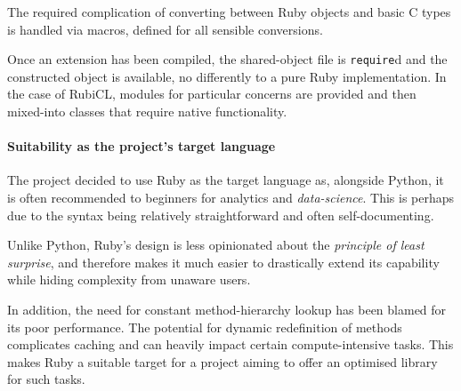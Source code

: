 The required complication of converting between Ruby objects and basic C types is handled via macros, defined for all sensible conversions.

Once an extension has been compiled, the shared-object file is \verb|require|d and the constructed object is available, no differently to a pure Ruby implementation. In the case of RubiCL, modules for particular concerns are provided and then mixed-into classes that require native functionality.

\paragraph*{Suitability as the project's target language}
The project decided to use Ruby as the target language as, alongside Python, it is often recommended to beginners for analytics and \emph{data-science}. This is perhaps due to the syntax being relatively straightforward and often self-documenting.

Unlike Python, Ruby's design is less opinionated about the \emph{principle of least surprise}, and therefore makes it much easier to drastically extend its capability while hiding complexity from unaware users. 

In addition, the need for constant method-hierarchy lookup has been blamed for its poor performance. The potential for dynamic redefinition of methods complicates caching and can heavily impact certain compute-intensive tasks. This makes Ruby a suitable target for a project aiming to offer an optimised library for such tasks.

